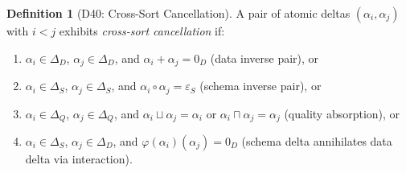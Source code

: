 \documentclass[11pt,a4paper]{article}
\theoremstyle{definition}
\newtheorem{definition}[theorem]{Definition}
\newcommand{\DeltaS}{\Delta_{\!S}}
\newcommand{\DeltaD}{\Delta_{\!D}}
\newcommand{\DeltaQ}{\Delta_{\!Q}}
\newcommand{\epsS}{\varepsilon_S}
\newcommand{\zeroD}{0_D}
\begin{document}
\begin{definition}[D40: Cross-Sort Cancellation]\label{def:cross-cancel}
A pair of atomic deltas $(\alpha_i, \alpha_j)$ with $i < j$ exhibits
\emph{cross-sort cancellation} if:
\begin{enumerate}[nosep]
  \item $\alpha_i \in \DeltaD$, $\alpha_j \in \DeltaD$, and
    $\alpha_i + \alpha_j = \zeroD$ (data inverse pair), or
  \item $\alpha_i \in \DeltaS$, $\alpha_j \in \DeltaS$, and
    $\alpha_i \circ \alpha_j = \epsS$ (schema inverse pair), or
  \item $\alpha_i \in \DeltaQ$, $\alpha_j \in \DeltaQ$, and
    $\alpha_i \sqcup \alpha_j = \alpha_i$ or
    $\alpha_i \sqcap \alpha_j = \alpha_j$ (quality absorption), or
  \item $\alpha_i \in \DeltaS$, $\alpha_j \in \DeltaD$, and
    $\varphi(\alpha_i)(\alpha_j) = \zeroD$
    (schema delta annihilates data delta via interaction).
\end{enumerate}
\end{definition}
\end{document}
